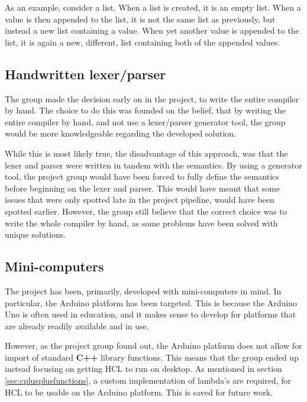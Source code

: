As an example, consider a list.
When a list is created, it is an empty list.
When a value is then appended to the list, it is not the same list as previously, but instead a new list containing a value.
When yet another value is appended to the list, it is again a new, different, list containing both of the appended values.

\subsection{Handwritten lexer/parser}
The group made the decision early on in the project, to write the entire compiler by hand.
The choice to do this was founded on the belief, that by writing the entire compiler by hand, and not use a lexer/parser generator tool, the group would be more knowledgeable regarding the developed solution.

While this is most likely true, the disadvantage of this approach, was that the lexer and parser were written in tandem with the semantics.
By using a generator tool, the project group would have been forced to fully define the semantics before beginning on the lexer and parser.
This would have meant that some issues that were only spotted late in the project pipeline, would have been spotted earlier.
However, the group still believe that the correct choice was to write the whole compiler by hand, as some problems have been solved with unique solutions.

\subsection{Mini-computers}
The project has been, primarily, developed with mini-computers in mind.
In particular, the Arduino platform has been targeted.
This is because the Arduino Uno is often used in education, and it makes sense to develop for platforms that are already readily available and in use.

However, as the project group found out, the Arduino platform does not allow for import of standard \textbf{C++} library functions.
This means that the group ended up instead focusing on getting HCL to run on desktop.
As mentioned in section \ref{sec:cplusplusfunctions}, a custom implementation of lambda's are required, for HCL to be usable on the Arduino platform.
This is saved for future work.


